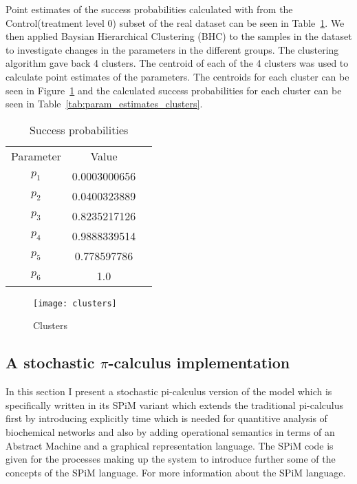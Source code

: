 Point estimates of the  success probabilities calculated with from the
Control(treatment level 0)
subset of the real dataset can be seen in
Table~\ref{tab:param_estimates}. We then applied Baysian Hierarchical
Clustering (BHC) to the samples in the dataset to investigate changes
in the parameters in the different groups. The clustering algorithm
gave back 4 clusters. The centroid of each of the 4 clusters was used
to calculate point estimates of the parameters. The centroids for each
cluster can be seen in Figure~\ref{fig:clusters} and the calculated
success probabilities for each cluster can be seen in
Table~\ref{tab:param_estimates_clusters}.

\begin{table}
\centering
    \begin{tabular}{ccc}
    Parameter & Value \\
    $p_1$ &  0.0003000656 \\
    $p_2$ & 0.0400323889\\
    $p_3$ &  0.8235217126\\
    $p_4$ &  0.9888339514\\
    $p_5$ &  0.778597786 \\
    $p_6$ &  1.0
    \end{tabular}
\caption{Success probabilities}
\label{tab:param_estimates}
\end{table}

\begin{figure}[htbp!]
\centering
\texttt{[image: clusters]}
\caption[ML inverse problem formulation]{Clusters}
\label{fig:clusters}
\end{figure}






\subsection{A stochastic $\pi$-calculus implementation}
In this section I present a stochastic pi-calculus version of the
model which is specifically written in its SPiM variant which extends
the traditional pi-calculus first by introducing explicitly time which
is needed for quantitive analysis of biochemical networks and also by
adding operational semantics in terms of an Abstract Machine and a
graphical representation language. The SPiM code is given for the
processes making up the system to introduce further some of the
concepts of the SPiM language. For more information about the SPiM
language.

